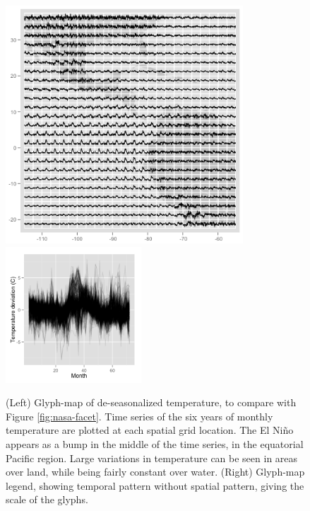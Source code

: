 \documentclass[oneside]{article}
\begin{document}
\begin{figure}[htbp]
  \centering
  \includegraphics[width=3.5in]{nasa-deseas-glyph}
  \includegraphics[width=2in]{nasa-deseas-glyph-leg}
  \caption{(Left) Glyph-map of de-seasonalized temperature, to compare with Figure \ref{fig:nasa-facet}. Time series of the six years of monthly temperature are plotted at each spatial grid location. The El Ni\~no appears as a bump in the middle of the time series, in the equatorial Pacific region. Large variations in temperature can be seen in areas over land, while being fairly constant over water. (Right) Glyph-map legend, showing temporal pattern without spatial pattern, giving the scale of the glyphs.}
  \label{fig:nasa-glyph}
\end{figure}
\end{document}
